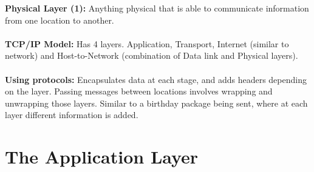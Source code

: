 \documentclass[a4paper,10pt]{article}
\begin{document}
\textcolor{TealBlue}{\textbf{Physical Layer (1):}} Anything physical that is able to communicate information from one location to another. \\\\
\textcolor{TealBlue}{\textbf{TCP/IP Model:}} Has 4 layers. Application, Transport, Internet (similar to network) and Host-to-Network (combination of Data link and Physical layers). \\\\
\textcolor{TealBlue}{\textbf{Using protocols:}} Encapsulates data at each stage, and adds headers depending on the layer. Passing messages between locations involves wrapping and unwrapping those layers. Similar to a birthday package being sent, where at each layer different information is added.
\newpage
\section{The Application Layer}
\end{document}

